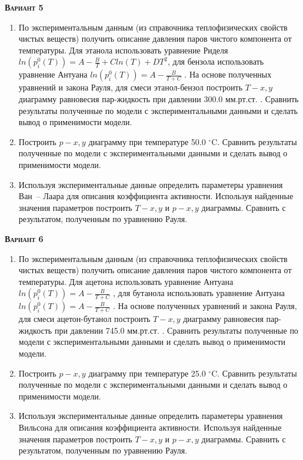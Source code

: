 \textsc{\textbf{Вариант 5}}
\begin{enumerate}
\item По экспериментальным данным (из справочника теплофизических свойств чистых веществ) получить описание давления паров чистого компонента от температуры. Для этанола использовать уравнение Риделя $ln(p_i^0(T))=A-\frac{B}{T}+C ln(T)+DT^2$, для бензола использовать уравнение Антуана $ln(p_i^0(T))=A-\frac{B}{T+C}$         . На основе полученных уравнений и закона Рауля, для смеси этанол-бензол построить $T-x,y$ диаграмму равновесия пар-жидкость при давлении  300.0 мм.рт.ст. . Сравнить результаты полученные по модели с экспериментальными данными и сделать вывод о применимости модели.

\item Построить $p-x,y$ диаграмму при температуре   50.0 $^\circ$C. Сравнить результаты полученные по модели с экспериментальными данными и сделать вывод о применимости модели. \item Используя экспериментальные данные определить параметеры уравнения Ван~-- Лаара для описания коэффициента активности. Используя найденные значения параметров построить $T-x,y$ и $p-x,y$ диаграммы. Сравнить с результатом, полученным по уравнению Рауля.\end{enumerate}

\textsc{\textbf{Вариант 6}}
\begin{enumerate}
\item По экспериментальным данным (из справочника теплофизических свойств чистых веществ) получить описание давления паров чистого компонента от температуры. Для ацетона использовать уравнение Антуана $ln(p_i^0(T))=A-\frac{B}{T+C}$         , для бутанола использовать уравнение Антуана $ln(p_i^0(T))=A-\frac{B}{T+C}$         . На основе полученных уравнений и закона Рауля, для смеси ацетон-бутанол построить $T-x,y$ диаграмму равновесия пар-жидкость при давлении  745.0 мм.рт.ст. . Сравнить результаты полученные по модели с экспериментальными данными и сделать вывод о применимости модели.

\item Построить $p-x,y$ диаграмму при температуре   25.0 $^\circ$C. Сравнить результаты полученные по модели с экспериментальными данными и сделать вывод о применимости модели. \item Используя экспериментальные данные определить параметеры уравнения Вильсона     для описания коэффициента активности. Используя найденные значения параметров построить $T-x,y$ и $p-x,y$ диаграммы. Сравнить с результатом, полученным по уравнению Рауля.\end{enumerate}

